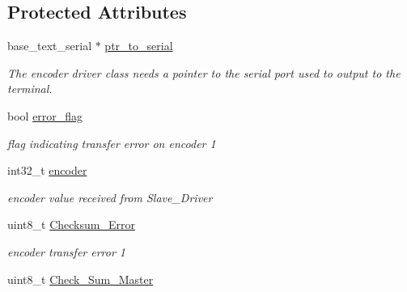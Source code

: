 \subsection*{Protected Attributes}
\begin{DoxyCompactItemize}
\item 
\hypertarget{classMaster_a826ae7a92e5910b4bf275a128a5aafc0}{base\-\_\-text\-\_\-serial $\ast$ \hyperlink{classMaster_a826ae7a92e5910b4bf275a128a5aafc0}{ptr\-\_\-to\-\_\-serial}}\label{classMaster_a826ae7a92e5910b4bf275a128a5aafc0}

\begin{DoxyCompactList}\small\item\em The encoder driver class needs a pointer to the serial port used to output to the terminal. \end{DoxyCompactList}\item 
\hypertarget{classMaster_a4c51d672c465103b0e3a85ff5ae68d79}{bool \hyperlink{classMaster_a4c51d672c465103b0e3a85ff5ae68d79}{error\-\_\-flag}}\label{classMaster_a4c51d672c465103b0e3a85ff5ae68d79}

\begin{DoxyCompactList}\small\item\em flag indicating transfer error on encoder 1 \end{DoxyCompactList}\item 
\hypertarget{classMaster_a3183754384c4bfd6a920c82e5e3b1618}{int32\-\_\-t \hyperlink{classMaster_a3183754384c4bfd6a920c82e5e3b1618}{encoder}}\label{classMaster_a3183754384c4bfd6a920c82e5e3b1618}

\begin{DoxyCompactList}\small\item\em encoder value received from Slave\-\_\-\-Driver \end{DoxyCompactList}\item 
\hypertarget{classMaster_a65e5841164cc7b6e5c5501c12e5a797a}{uint8\-\_\-t \hyperlink{classMaster_a65e5841164cc7b6e5c5501c12e5a797a}{Checksum\-\_\-\-Error}}\label{classMaster_a65e5841164cc7b6e5c5501c12e5a797a}

\begin{DoxyCompactList}\small\item\em encoder transfer error 1 \end{DoxyCompactList}\item 
\hypertarget{classMaster_a1d30123857f1025903e8b6d8a30cff95}{uint8\-\_\-t \hyperlink{classMaster_a1d30123857f1025903e8b6d8a30cff95}{Check\-\_\-\-Sum\-\_\-\-Master}}\label{classMaster_a1d30123857f1025903e8b6d8a30cff95}


\end{DoxyCompactItemize}
